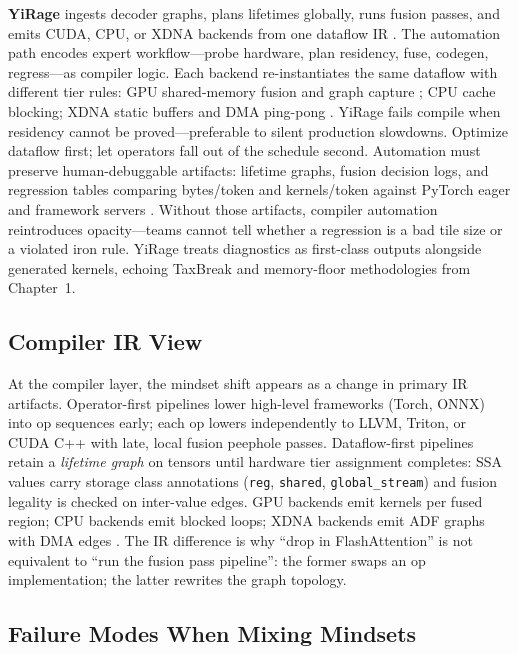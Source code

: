 \textbf{YiRage} ingests decoder graphs, plans lifetimes globally, runs fusion passes, and emits CUDA, CPU, or XDNA backends from one dataflow IR \citep{amd2024xdna,nvidia2022hopper}.
The automation path encodes expert workflow---probe hardware, plan residency, fuse, codegen, regress---as compiler logic.
Each backend re-instantiates the same dataflow with different tier rules: GPU shared-memory fusion and graph capture \citep{nvidia2024cudagraphs}; CPU cache blocking; XDNA static buffers and DMA ping-pong \citep{amd2024aie}.
YiRage fails compile when residency cannot be proved---preferable to silent production slowdowns.
Optimize dataflow first; let operators fall out of the schedule second.
Automation must preserve human-debuggable artifacts: lifetime graphs, fusion decision logs, and regression tables comparing bytes/token and kernels/token against PyTorch eager and framework servers \citep{taxbreak2026}.
Without those artifacts, compiler automation reintroduces opacity---teams cannot tell whether a regression is a bad tile size or a violated iron rule.
YiRage treats diagnostics as first-class outputs alongside generated kernels, echoing TaxBreak and memory-floor methodologies from Chapter~1.

\subsection{Compiler IR View}
\label{sec:compiler_ir_view}

At the compiler layer, the mindset shift appears as a change in primary IR artifacts.
Operator-first pipelines lower high-level frameworks (Torch, ONNX) into op sequences early; each op lowers independently to LLVM, Triton, or CUDA C++ with late, local fusion peephole passes.
Dataflow-first pipelines retain a \emph{lifetime graph} on tensors until hardware tier assignment completes: SSA values carry storage class annotations (\texttt{reg}, \texttt{shared}, \texttt{global\_stream}) and fusion legality is checked on inter-value edges.
GPU backends emit kernels per fused region; CPU backends emit blocked loops; XDNA backends emit ADF graphs with DMA edges \citep{amd2024xdna}.
The IR difference is why ``drop in FlashAttention'' is not equivalent to ``run the fusion pass pipeline'': the former swaps an op implementation; the latter rewrites the graph topology.

\subsection{Failure Modes When Mixing Mindsets}
\label{sec:mixed_failure}

